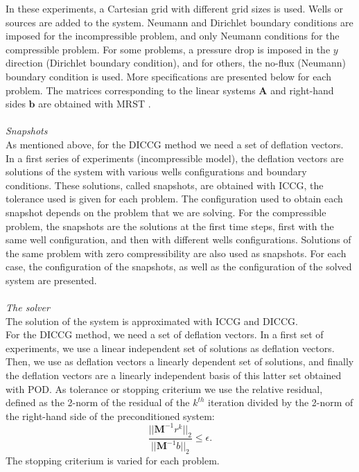 \documentclass[12pt]{article}
\begin{document}
In these experiments, a Cartesian grid with different grid sizes is used. Wells or sources are added to the system. 
Neumann and Dirichlet boundary conditions are imposed for the incompressible problem, and only Neumann conditions for the compressible problem. For some problems, a pressure drop is 
imposed in the $y$ direction (Dirichlet boundary condition), and for others, the no-flux (Neumann) boundary condition 
is used.
More specifications are presented below for each problem. 
The matrices corresponding to the linear systems $\mathbf{A}$ and right-hand sides $\mathbf{b}$ are obtained with MRST \cite{Lie13}.
\\ \\
\emph{Snapshots}\\
As mentioned above, for the DICCG method we need a set of deflation vectors. In a first series of
experiments (incompressible model), the deflation vectors are 
solutions of the system with various wells configurations and boundary conditions. These solutions, 
called snapshots, are obtained with ICCG, the tolerance used is given for each problem. 
The configuration used to obtain each snapshot depends on the problem that we are solving. 
For the compressible problem, the snapshots are the solutions at the first time steps, first with the same well configuration, and then with different wells configurations. Solutions of the same problem with zero compressibility are also used as snapshots.
For each case,
the configuration of the snapshots, as well as the configuration of the solved system are presented.
\\ \\
\emph{The solver}\\
The solution of the system is approximated with ICCG and DICCG.\\
For the DICCG method, we need a set of deflation vectors. 
In a first set of experiments, we use a linear independent set of solutions as deflation vectors. Then, we use as deflation vectors a linearly dependent set of solutions, and finally the deflation vectors are a linearly independent basis of this latter set obtained with POD.
As tolerance or stopping criterium we use the relative residual, defined as the 2-norm of the residual of the $k^{th}$ iteration divided by 
the 2-norm of the right-hand side of the preconditioned system: 
$$\frac{||\mathbf{M}^{-1}r^k||_2}{||\mathbf{M}^{-1}b||_2}\leq \epsilon.$$
The stopping criterium is varied for each problem. 
\\ \\
\end{document}

